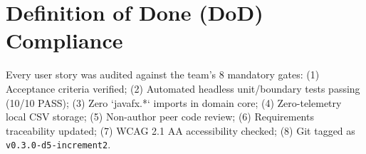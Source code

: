 \documentclass[12pt,a4paper]{article}
\begin{document}
\section{Definition of Done (DoD) Compliance}
Every user story was audited against the team's 8 mandatory gates: (1) Acceptance criteria verified; (2) Automated headless unit/boundary tests passing (10/10 PASS); (3) Zero `javafx.*` imports in domain core; (4) Zero-telemetry local CSV storage; (5) Non-author peer code review; (6) Requirements traceability updated; (7) WCAG 2.1 AA accessibility checked; (8) Git tagged as \texttt{v0.3.0-d5-increment2}.
\end{document}
